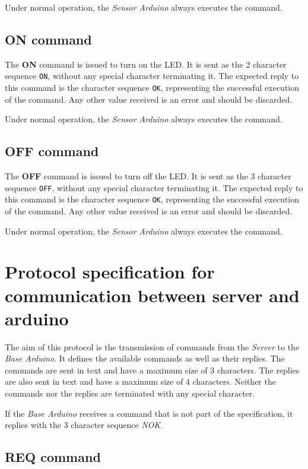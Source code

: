 \documentclass[conference, a4paper]{IEEEtran}
\begin{document}
Under normal operation, the \textit{Sensor Arduino} always executes the command.

\subsection{ON command}

The \textbf{ON} command is issued to turn on the LED. It is sent as the 2 character sequence \texttt{ON}, without any special character terminating it. The expected reply to this command is the character sequence \texttt{OK}, representing the successful execution of the command. Any other value received is an error and should be discarded.

Under normal operation, the \textit{Sensor Arduino} always executes the command.

\subsection{OFF command}

The \textbf{OFF} command is issued to turn off the LED. It is sent as the 3 character sequence \texttt{OFF}, without any special character terminating it. The expected reply to this command is the character sequence \texttt{OK}, representing the successful execution of the command. Any other value received is an error and should be discarded.

Under normal operation, the \textit{Sensor Arduino} always executes the command.

\section{Protocol specification for communication between server and arduino}
\label{prot_serv}

The aim of this protocol is the transmission of commands from the \textit{Server} to the \textit{Base Arduino}. It defines the available commands as well as their replies. The commands are sent in text and have a maximum size of 3 characters. The replies are also sent in text and have a maximum size of 4 characters. Neither the commands nor the replies are terminated with any special character.

If the \textit{Base Arduino} receives a command that is not part of the specification, it replies with the 3 character sequence \textit{NOK}.

\subsection{REQ command}
\end{document}
